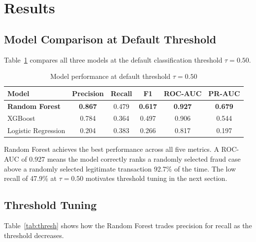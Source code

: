 \documentclass[12pt, a4paper]{article}
\begin{document}
\section{Results}

\subsection{Model Comparison at Default Threshold}

Table~\ref{tab:results} compares all three models at the default classification
threshold $\tau = 0.50$.

\begin{table}[H]
    \centering
    \caption{Model performance at default threshold $\tau = 0.50$}
    \label{tab:results}
    \begin{tabular}{lccccc}
        \toprule
        \textbf{Model} & \textbf{Precision} & \textbf{Recall} &
        \textbf{F1} & \textbf{ROC-AUC} & \textbf{PR-AUC} \\
        \midrule
        \textbf{Random Forest}  & \textbf{0.867} & 0.479 & \textbf{0.617} &
        \textbf{0.927} & \textbf{0.679} \\
        XGBoost                 & 0.784 & 0.364 & 0.497 & 0.906 & 0.544 \\
        Logistic Regression     & 0.204 & 0.383 & 0.266 & 0.817 & 0.197 \\
        \bottomrule
    \end{tabular}
\end{table}

Random Forest achieves the best performance across all five metrics. A ROC-AUC of
0.927 means the model correctly ranks a randomly selected fraud case above a
randomly selected legitimate transaction 92.7\% of the time. The low recall of
47.9\% at $\tau = 0.50$ motivates threshold tuning in the next section.

\subsection{Threshold Tuning}

Table~\ref{tab:thresh} shows how the Random Forest trades precision for recall as
the threshold decreases.
\end{document}

